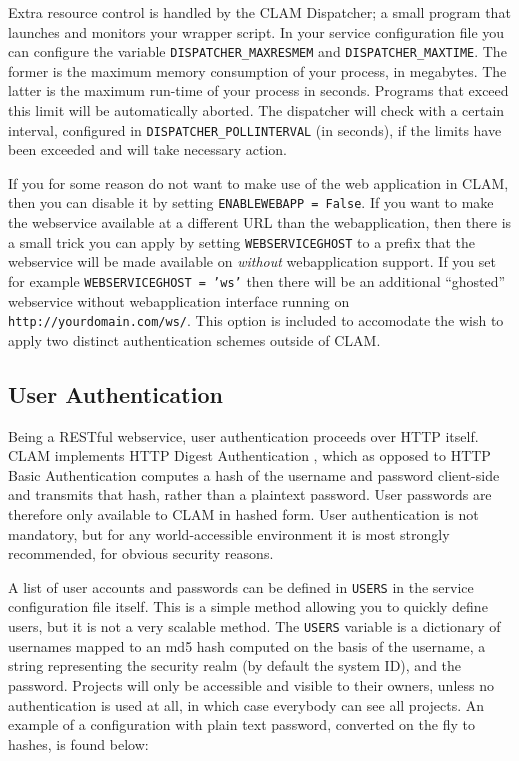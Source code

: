 \documentclass[a4paper,12pt]{report}
\begin{document}
Extra resource control is handled by the CLAM Dispatcher; a small program that
launches and monitors your wrapper script. In your service configuration file
you can configure the variable \texttt{DISPATCHER\_MAXRESMEM} and
\texttt{DISPATCHER\_MAXTIME}. The former is the maximum memory consumption of
your process, in megabytes. The latter is the maximum run-time of your process
in seconds. Programs that exceed this limit will be automatically aborted. The
dispatcher will check with a certain interval, configured in
\texttt{DISPATCHER\_POLLINTERVAL} (in seconds), if the limits have been
exceeded and will take necessary action.  
  

If you for some reason do not want to make use of the web application in CLAM,
then you can disable it by setting \texttt{ENABLEWEBAPP = False}. If you want
to make the webservice available at a different URL than the webapplication,
then there is a small trick you can apply by setting \texttt{WEBSERVICEGHOST}
to a prefix that the webservice will be made available on \emph{without}
webapplication support. If you set for example \texttt{WEBSERVICEGHOST = 'ws'}
then there will be an additional ``ghosted'' webservice without webapplication
interface running on \texttt{http://yourdomain.com/ws/}. This option is
included to accomodate the wish to apply two distinct authentication schemes
outside of CLAM. 


\subsection{User Authentication}

Being a RESTful webservice, user authentication proceeds over HTTP itself. CLAM
implements HTTP Digest Authentication \cite{HTTPAUTH}, which as opposed to HTTP Basic
Authentication computes a hash of the username and password client-side and
transmits that hash, rather than a plaintext password. User passwords are
therefore only available to CLAM in hashed form. User authentication is not
mandatory, but for any world-accessible environment it is most strongly
recommended, for obvious security reasons. 

A list of user accounts and passwords can be defined in \texttt{USERS} in the
service configuration file itself. This is a simple method allowing you to
quickly define users, but it is not a very scalable method. The \texttt{USERS}
variable is a dictionary of usernames mapped to an md5 hash computed on the
basis of the username, a string representing the security realm (by default the
system ID), and the password. Projects will only be accessible and visible to
their owners, unless no authentication is used at all, in which case everybody
can see all projects. An example of a configuration with plain text password,
converted on the fly to hashes, is found below:
\end{document}
